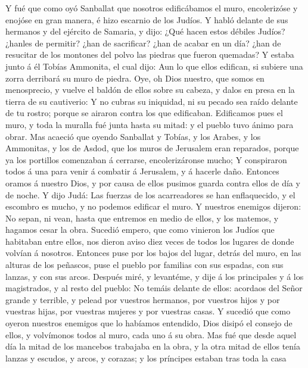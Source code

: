  Y fué que como oyó Sanballat que nosotros edificábamos el
muro, encolerizóse y enojóse en gran manera, é hizo escarnio de los
Judíos.  Y habló delante de sus hermanos y del ejército de
Samaria, y dijo: ¿Qué hacen estos débiles Judíos? ¿hanles de permitir?
¿han de sacrificar? ¿han de acabar en un día? ¿han de resucitar de los
montones del polvo las piedras que fueron quemadas?  Y
estaba junto á él Tobías Ammonita, el cual dijo: Aun lo que ellos
edifican, si subiere una zorra derribará su muro de piedra. 
Oye, oh Dios nuestro, que somos en menosprecio, y vuelve el baldón de
ellos sobre su cabeza, y dalos en presa en la tierra de su cautiverio:
 Y no cubras su iniquidad, ni su pecado sea raído delante de
tu rostro; porque se airaron contra los que edificaban. 
Edificamos pues el muro, y toda la muralla fué junta hasta su mitad: y
el pueblo tuvo ánimo para obrar.  Mas acaeció que oyendo
Sanballat y Tobías, y los Arabes, y los Ammonitas, y los de Asdod, que
los muros de Jerusalem eran reparados, porque ya los portillos
comenzaban á cerrarse, encolerizáronse mucho;  Y conspiraron
todos á una para venir á combatir á Jerusalem, y á hacerle daño.
 Entonces oramos á nuestro Dios, y por causa de ellos
pusimos guarda contra ellos de día y de noche.  Y dijo
Judá: Las fuerzas de los acarreadores se han enflaquecido, y el escombro
es mucho, y no podemos edificar el muro.  Y nuestros
enemigos dijeron: No sepan, ni vean, hasta que entremos en medio de
ellos, y los matemos, y hagamos cesar la obra.  Sucedió
empero, que como vinieron los Judíos que habitaban entre ellos, nos
dieron aviso diez veces de todos los lugares de donde volvían á
nosotros.  Entonces puse por los bajos del lugar, detrás
del muro, en las alturas de los peñascos, puse el pueblo por familias
con sus espadas, con sus lanzas, y con sus arcos.  Después
miré, y levantéme, y dije á los principales y á los magistrados, y al
resto del pueblo: No temáis delante de ellos: acordaos del Señor grande
y terrible, y pelead por vuestros hermanos, por vuestros hijos y por
vuestras hijas, por vuestras mujeres y por vuestras casas. 
Y sucedió que como oyeron nuestros enemigos que lo habíamos entendido,
Dios disipó el consejo de ellos, y volvímonos todos al muro, cada uno á
su obra.  Mas fué que desde aquel día la mitad de los
mancebos trabajaba en la obra, y la otra mitad de ellos tenía lanzas y
escudos, y arcos, y corazas; y los príncipes estaban tras toda la casa
